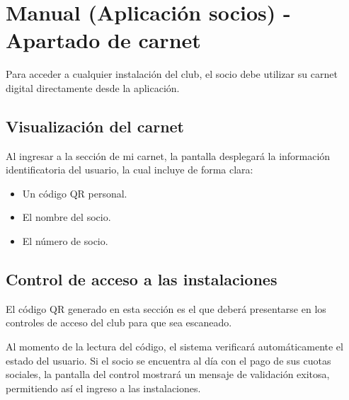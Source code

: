 \section{Manual (Aplicación socios) - Apartado de carnet}

Para acceder a cualquier instalación del club, el socio debe utilizar su carnet digital directamente desde la aplicación.

\subsection{Visualización del carnet}
Al ingresar a la sección de mi carnet, la pantalla desplegará la información identificatoria del usuario, la cual incluye de forma clara:
\begin{itemize}
    \item Un código QR personal.
    \item El nombre del socio.
    \item El número de socio.
\end{itemize}

\subsection{Control de acceso a las instalaciones}
El código QR generado en esta sección es el que deberá presentarse en los controles de acceso del club para que sea escaneado. 

Al momento de la lectura del código, el sistema verificará automáticamente el estado del usuario. Si el socio se encuentra al día con el pago de sus cuotas sociales, la pantalla del control mostrará un mensaje de validación exitosa, permitiendo así el ingreso a las instalaciones.
